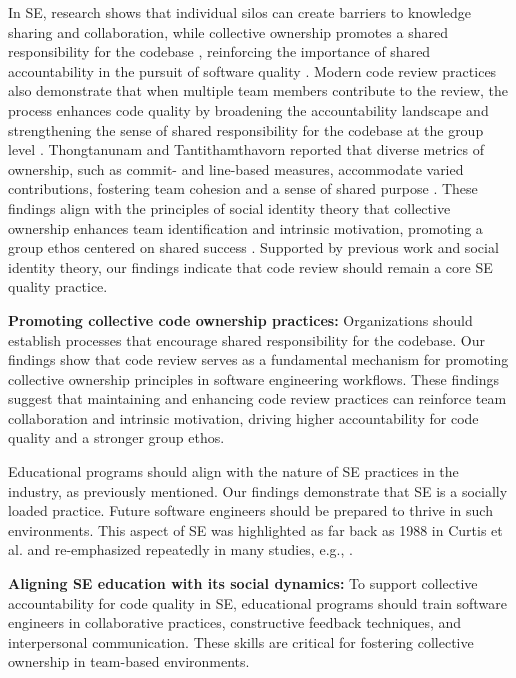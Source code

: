 In SE, research shows that individual silos can create barriers to knowledge sharing and collaboration, while collective ownership promotes a shared responsibility for the codebase \citep{bird2011don}, reinforcing the importance of shared accountability in the pursuit of software quality \citep{alami2024understanding}. Modern code review practices also demonstrate that when multiple team members contribute to the review, the process enhances code quality by broadening the accountability landscape and strengthening the sense of shared responsibility for the codebase at the group level \citep{greiler2015code}. Thongtanunam and Tantithamthavorn reported that diverse metrics of ownership, such as commit- and line-based measures, accommodate varied contributions, fostering team cohesion and a sense of shared purpose \citep{thongtanunam2024code}. These findings align with the principles of social identity theory that collective ownership enhances team identification and intrinsic motivation, promoting a group ethos centered on shared success \citep{tajfel1979integrative}. Supported by previous work and social identity theory, our findings indicate that code review should remain a core SE quality practice.

\begin{tcolorbox} 

\textbf{Promoting collective code ownership practices:} Organizations should establish processes that encourage shared responsibility for the codebase. Our findings show that code review serves as a fundamental mechanism for promoting collective ownership principles in software engineering workflows. These findings suggest that maintaining and enhancing code review practices can reinforce team collaboration and intrinsic motivation, driving higher accountability for code quality and a stronger group ethos.

\end{tcolorbox}

Educational programs should align with the nature of SE practices in the industry, as previously mentioned. Our findings demonstrate that SE is a socially loaded practice. Future software engineers should be prepared to thrive in such environments. This aspect of SE was highlighted as far back as 1988 in Curtis et al. \citep{curtis1988field} and re-emphasized repeatedly in many studies, e.g., \citep{demarco2013peopleware,salas2008teams,begel2008pair,ACMed23}.

\begin{tcolorbox} 

\textbf{Aligning SE education with its social dynamics:} To support collective accountability for code quality in SE, educational programs should train software engineers in collaborative practices, constructive feedback techniques, and interpersonal communication. These skills are critical for fostering collective ownership in team-based environments.

\end{tcolorbox}


